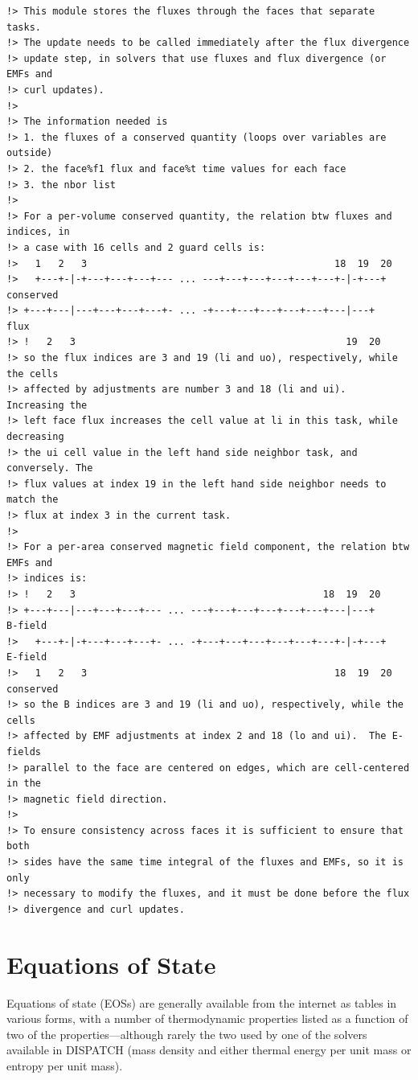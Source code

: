\documentclass[paper=a4,fontsize=11pt]{scrartcl}
\numberwithin{equation}{section}		%
\numberwithin{figure}{section}			%
\numberwithin{table}{section}				%
\newcommand{\codecolor}{\color{Blue}}
\begin{document}
{\codecolor\begin{verbatim}
!> This module stores the fluxes through the faces that separate tasks.
!> The update needs to be called immediately after the flux divergence
!> update step, in solvers that use fluxes and flux divergence (or EMFs and
!> curl updates).
!>
!> The information needed is
!> 1. the fluxes of a conserved quantity (loops over variables are outside)
!> 2. the face%f1 flux and face%t time values for each face
!> 3. the nbor list
!>
!> For a per-volume conserved quantity, the relation btw fluxes and indices, in
!> a case with 16 cells and 2 guard cells is:
!>   1   2   3                                           18  19  20
!>   +---+-|-+---+---+---+--- ... ---+---+---+---+---+---+-|-+---+   conserved
!> +---+---|---+---+---+---+- ... -+---+---+---+---+---+---|---+     flux
!> !   2   3                                               19  20
!> so the flux indices are 3 and 19 (li and uo), respectively, while the cells
!> affected by adjustments are number 3 and 18 (li and ui).  Increasing the
!> left face flux increases the cell value at li in this task, while decreasing
!> the ui cell value in the left hand side neighbor task, and conversely. The
!> flux values at index 19 in the left hand side neighbor needs to match the
!> flux at index 3 in the current task.
!>
!> For a per-area conserved magnetic field component, the relation btw EMFs and
!> indices is:
!> !   2   3                                           18  19  20
!> +---+---|---+---+---+--- ... ---+---+---+---+---+---+---|---+     B-field
!>   +---+-|-+---+---+---+- ... -+---+---+---+---+---+---+-|-+---+   E-field
!>   1   2   3                                           18  19  20  conserved
!> so the B indices are 3 and 19 (li and uo), respectively, while the cells
!> affected by EMF adjustments at index 2 and 18 (lo and ui).  The E-fields
!> parallel to the face are centered on edges, which are cell-centered in the
!> magnetic field direction.
!>
!> To ensure consistency across faces it is sufficient to ensure that both
!> sides have the same time integral of the fluxes and EMFs, so it is only
!> necessary to modify the fluxes, and it must be done before the flux
!> divergence and curl updates.
\end{verbatim}}


\section{Equations of State}
Equations of state (EOSs) are generally available from the internet as tables in various forms, with a number of thermodynamic properties listed as a function of two of the properties---although rarely the two used by one of the solvers available in DISPATCH (mass density and either thermal energy per unit mass or entropy per unit mass).
\end{document}
